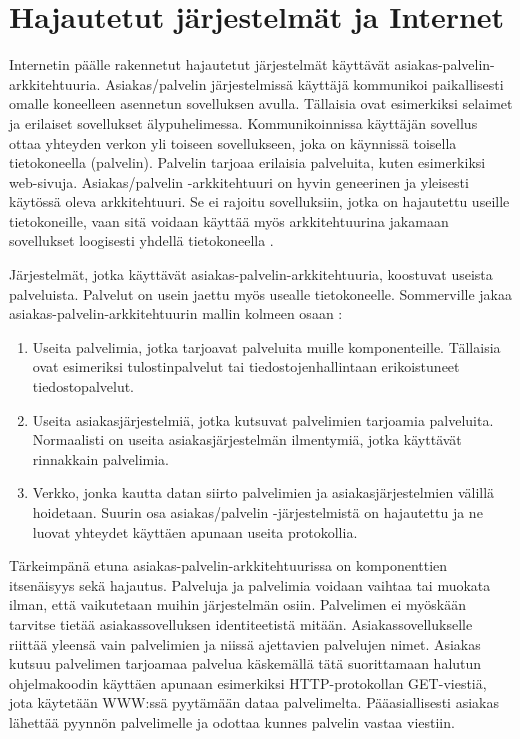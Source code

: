 \documentclass[utf8]{gradu3}
\begin{document}
\section{Hajautetut järjestelmät ja Internet}

Internetin päälle rakennetut hajautetut järjestelmät käyttävät asiakas-palvelin-arkkitehtuuria. Asiakas/palvelin järjestelmissä käyttäjä kommunikoi paikallisesti omalle koneelleen asennetun sovelluksen avulla. Tällaisia ovat esimerkiksi selaimet ja erilaiset sovellukset älypuhelimessa. Kommunikoinnissa käyttäjän sovellus ottaa yhteyden verkon yli toiseen sovellukseen, joka on käynnissä toisella tietokoneella (palvelin). Palvelin tarjoaa erilaisia palveluita, kuten esimerkiksi web-sivuja. Asiakas/palvelin -arkkitehtuuri on hyvin geneerinen ja yleisesti käytössä oleva arkkitehtuuri. Se ei rajoitu sovelluksiin, jotka on hajautettu useille tietokoneille, vaan sitä voidaan käyttää myös arkkitehtuurina jakamaan sovellukset loogisesti yhdellä tietokoneella \parencite[s.488]{Sommerville}.

Järjestelmät, jotka käyttävät asiakas-palvelin-arkkitehtuuria, koostuvat useista palveluista. Palvelut on usein jaettu myös usealle tietokoneelle. Sommerville jakaa asiakas-palvelin-arkkitehtuurin mallin kolmeen osaan \parencite[s. 161]{Sommerville}: 

\begin{enumerate} 
\item Useita palvelimia, jotka tarjoavat palveluita muille komponenteille. Tällaisia ovat esimeriksi tulostinpalvelut tai tiedostojenhallintaan erikoistuneet tiedostopalvelut.
\item Useita asiakasjärjestelmiä, jotka kutsuvat palvelimien tarjoamia palveluita. Normaalisti on useita asiakasjärjestelmän ilmentymiä, jotka käyttävät rinnakkain palvelimia.
\item Verkko, jonka kautta datan siirto palvelimien ja asiakasjärjestelmien välillä hoidetaan. Suurin osa asiakas/palvelin -järjestelmistä on hajautettu ja ne luovat yhteydet käyttäen apunaan useita protokollia.
\end{enumerate}

Tärkeimpänä etuna asiakas-palvelin-arkkitehtuurissa on komponenttien itsenäisyys sekä hajautus. Palveluja ja palvelimia voidaan vaihtaa tai muokata ilman, että vaikutetaan muihin järjestelmän osiin. Palvelimen ei myöskään tarvitse tietää asiakassovelluksen identiteetistä mitään. Asiakassovellukselle riittää yleensä vain palvelimien ja niissä ajettavien palvelujen nimet. Asiakas kutsuu palvelimen tarjoamaa palvelua käskemällä tätä suorittamaan halutun ohjelmakoodin käyttäen apunaan esimerkiksi HTTP-protokollan GET-viestiä, jota käytetään WWW:ssä pyytämään dataa palvelimelta. Pääasiallisesti asiakas lähettää pyynnön palvelimelle ja odottaa kunnes palvelin vastaa viestiin.
\end{document}
